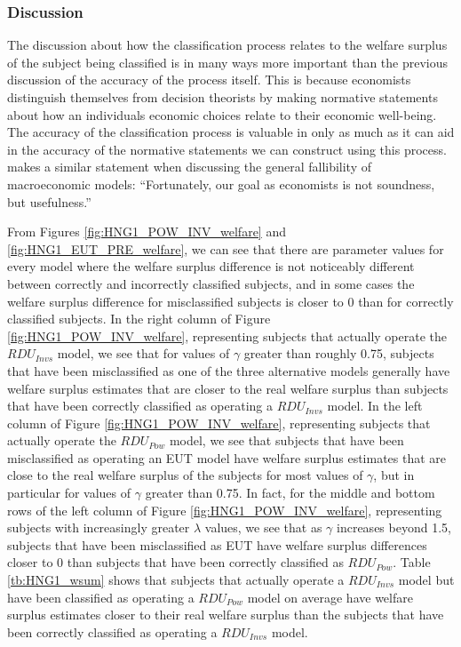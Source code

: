 \documentclass[../main.tex]{subfiles}
\begin{document}
\subsubsection{Discussion}

The discussion about how the classification process relates to the welfare surplus of the subject being classified is in many ways more important than the previous discussion of the accuracy of the process itself.
This is because economists distinguish themselves from decision theorists by making normative statements about how an individuals economic choices relate to their economic well-being.
The accuracy of the classification process is valuable in only as much as it can aid in the accuracy of the normative statements we can construct using this process.
\textcite[25]{Leamer2012} makes a similar statement when discussing the general fallibility of macroeconomic models: \enquote{Fortunately, our goal as economists is not soundness, but usefulness.}

From Figures \ref{fig:HNG1_POW_INV_welfare} and \ref{fig:HNG1_EUT_PRE_welfare}, we can see that there are parameter values for every model where the welfare surplus difference is not noticeably different between correctly and incorrectly classified subjects, and in some cases the welfare surplus difference for misclassified subjects is closer to 0 than for correctly classified subjects.
In the right column of Figure \ref{fig:HNG1_POW_INV_welfare}, representing subjects that actually operate the $\mathit{RDU_{Invs}}$ model, we see that for values of $\gamma$ greater than roughly 0.75, subjects that have been misclassified as one of the three alternative models generally have welfare surplus estimates that are closer to the real welfare surplus than subjects that have been correctly classified as operating a $\mathit{RDU_{Invs}}$ model.
In the left column of Figure \ref{fig:HNG1_POW_INV_welfare}, representing subjects that actually operate the $\mathit{RDU_{Pow}}$ model, we see that subjects that have been misclassified as operating an EUT model have welfare surplus estimates that are close to the real welfare surplus of the subjects for most values of $\gamma$, but in particular for values of $\gamma$ greater than 0.75.
In fact, for the middle and bottom rows of the left column of Figure \ref{fig:HNG1_POW_INV_welfare}, representing subjects with increasingly greater $\lambda$ values, we see that as $\gamma$ increases beyond 1.5, subjects that have been misclassified as EUT have welfare surplus differences closer to 0 than subjects that have been correctly classified as $\mathit{RDU_{Pow}}$.
Table \ref{tb:HNG1_wsum} shows that subjects that actually operate a $\mathit{RDU_{Invs}}$ model but have been classified as operating a $\mathit{RDU_{Pow}}$ model on average have welfare surplus estimates closer to their real welfare surplus than the subjects that have been correctly classified as operating a $\mathit{RDU_{Invs}}$ model.
\end{document}

